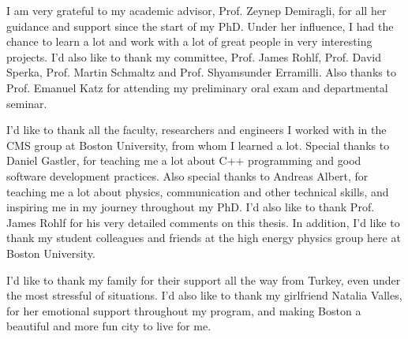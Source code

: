 I am very grateful to my academic advisor, Prof. Zeynep Demiragli, for all her guidance and support since the start of my PhD. 
Under her influence, I had the chance to learn a lot and work with a lot of great people in very interesting projects. 
I'd also like to thank my committee, Prof. James Rohlf, Prof. David Sperka, Prof. Martin
Schmaltz and Prof. Shyamsunder Erramilli. Also thanks to Prof. Emanuel Katz for attending my preliminary oral exam and departmental seminar. 

I'd like to thank all the faculty, researchers and engineers I worked with in the CMS group at Boston University, 
from whom I learned a lot. Special thanks to Daniel Gastler, for teaching me a lot about C++ programming and good software 
development practices. Also special thanks to Andreas Albert, for
teaching me a lot about physics, communication and other technical skills, and inspiring me in my journey throughout my PhD. I'd also like to thank
Prof. James Rohlf for his very detailed comments on this thesis. In addition, I'd like to thank my student colleagues and friends at the high energy
physics group here at Boston University.

I'd like to thank my family for their support all the way from Turkey, even under the most stressful of situations. I'd also like to thank 
my girlfriend Natalia Valles, for her emotional support throughout my program, and making Boston a beautiful and more fun city to live
for me. 

\vskip 1in

\noindent